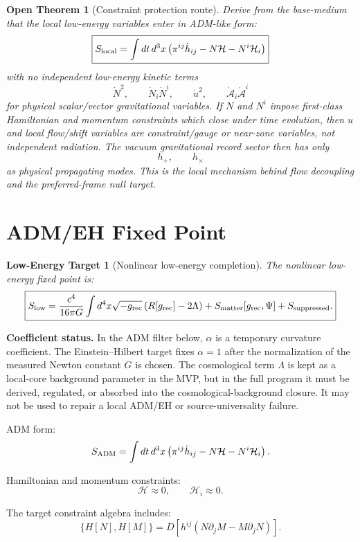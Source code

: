 \documentclass[11pt]{article}
\newtheorem{target}{Low-Energy Target}
\newtheorem{openthm}{Open Theorem}
\begin{document}
\begin{openthm}[Constraint protection route]
Derive from the base-medium that the local low-energy variables enter in
ADM-like form:
\[
\boxed{
S_{\rm local}
=
\int dt\,d^3x
\left(
\pi^{ij}\dot h_{ij}
-
N\mathcal H
-
N^i\mathcal H_i
\right)
}
\]
with no independent low-energy kinetic terms
\[
\boxed{
\dot N^2,\qquad
\dot N_i\dot N^i,\qquad
\dot u^2,\qquad
\dot{\mathcal A}_i\dot{\mathcal A}^i
}
\]
for physical scalar/vector gravitational variables.  If \(N\) and \(N^i\)
impose first-class Hamiltonian and momentum constraints which close under time
evolution, then \(u\) and local flow/shift variables are constraint/gauge or
near-zone variables, not independent radiation.  The vacuum gravitational
record sector then has only
\[
\boxed{
h_+,\qquad h_\times
}
\]
as physical propagating modes.  This is the local mechanism behind flow
decoupling and the preferred-frame null target.
\end{openthm}

\section{ADM/EH Fixed Point}

\begin{target}[Nonlinear low-energy completion]
The nonlinear low-energy fixed point is:
\[
\boxed{
S_{\rm low}
=
\frac{c^4}{16\pi G}
\int d^4x\sqrt{-g_{\rm rec}}\,(R[g_{\rm rec}]-2\Lambda)
+
S_{\rm matter}[g_{\rm rec},\Psi]
+
S_{\rm suppressed}.
}
\]
\end{target}

\medskip\noindent\textbf{Coefficient status.}
In the ADM filter below, \(\alpha\) is a temporary curvature coefficient.  The
Einstein--Hilbert target fixes \(\alpha=1\) after the normalization of the
measured Newton constant \(G\) is chosen.  The cosmological term \(\Lambda\) is
kept as a local-core background parameter in the MVP, but in the full program
it must be derived, regulated, or absorbed into the cosmological-background
closure.  It may not be used to repair a local ADM/EH or source-universality
failure.

ADM form:
\[
S_{\rm ADM}
=
\int dt\,d^3x
\left(
\pi^{ij}\dot h_{ij}
-
N\mathcal H
-
N^i\mathcal H_i
\right).
\]

Hamiltonian and momentum constraints:
\[
\mathcal H\approx0,
\qquad
\mathcal H_i\approx0.
\]

The target constraint algebra includes:
\[
\{H[N],H[M]\}
=
D\!\left[h^{ij}(N\partial_jM-M\partial_jN)\right].
\]
\end{document}
